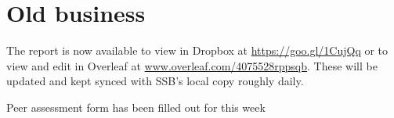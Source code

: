 \documentclass[a4paper,11pt,twoside,class=meetingmins,crop=false]{standalone}
\begin{document}

\maketitle


\section{Old business}
\begin{items}
    \item \priormins
    \item The report is now available to view in Dropbox at \url{https://goo.gl/1CujQq} or to view and edit in Overleaf at \url{www.overleaf.com/4075528rppsqb}. These will be updated and kept synced with SSB's local copy roughly daily.
    \item Peer assessment form has been filled out for this week
\end{items}
\end{document}
